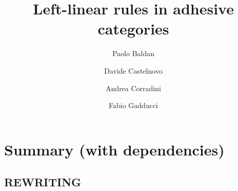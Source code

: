 \documentclass[a4paper,UKenglish,cleveref,pdftex, thm-restate,numberwithinsect]{lipics}
\title{Left-linear rules in adhesive categories}
\author{Paolo Baldan} 
{Department of Mathematics, University of Padova, Italy}
{baldan@math.unipd.it}{}{}
\author{Davide Castelnovo}
{Department of Mathematics, University of Padova, Italy}
{davide.castelnovo@math.unipd.it}{}{}
\author{Andrea Corradini}
{Department of Computer Science, University of Pisa, Italy}
{andrea.corradini@unipi.it}{}{}
\author{Fabio Gadducci}
{Department of Computer Science, University of Pisa, Italy}
{fabio.gadducci@unipi.it}{}{}
\begin{document}
\maketitle



\begin{abstract}
\end{abstract}


\iffalse \section*{Summary (with dependencies)}

\subsection*{REWRITING}
\end{document}
